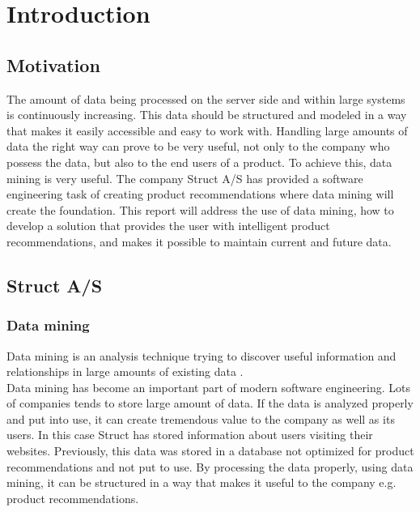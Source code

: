 
\chapter{Introduction} %

\label{ChapterX} %


\section{Motivation}
The amount of data being processed on the server side and within large systems is continuously increasing. This data should be structured and modeled in a way that makes it easily accessible and easy to work with. Handling large amounts of data the right way can prove to be very useful, not only to the company who possess the data, but also to the end users of a product. To achieve this, data mining is very useful.
The company Struct A/S \cite{Struct} has provided a software engineering task of creating product recommendations where data mining will create the foundation. This report will address the use of data mining, how to develop a solution that provides the user with intelligent product recommendations, and makes it possible to maintain current and future data.

\section{Struct A/S}

\subsection{Data mining}
Data mining is an analysis technique trying to discover useful information and relationships in large amounts of existing data \cite{dataminingSource}. \\  
Data mining has become an important part of modern software engineering. Lots of companies tends to store large amount of data. If the data is analyzed properly and put into use, it can create tremendous value to the company as well as its users. In this case Struct has stored information about users visiting their websites. Previously, this data was stored in a database not optimized for product recommendations and not put to use. By processing the data properly, using data mining, it can be structured in a way that makes it useful to the company e.g. product recommendations.

